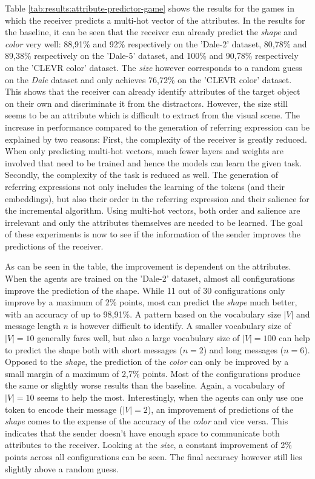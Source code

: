 Table \ref{tab:results:attribute-predictor-game} shows the results for the games in which the receiver predicts a multi-hot vector of the attributes.
In the results for the baseline, it can be seen that the receiver can already predict the \emph{shape} and \emph{color}  very well: 88,91\% and 92\% respectively on the 'Dale-2' dataset, 80,78\% and 89,38\% respectively on the 'Dale-5' dataset, and 100\% and 90,78\% respectively on the 'CLEVR color' dataset.
The \emph{size} however corresponds to a random guess on the \emph{Dale} dataset and only achieves 76,72\% on the 'CLEVR color' dataset.
This shows that the receiver can already identify attributes of the target object on their own and discriminate it from the distractors.
However, the size still seems to be an attribute which is difficult to extract from the visual scene.
The increase in performance compared to the generation of referring expression can be explained by two reasons:
First, the complexity of the receiver is greatly reduced.
When only predicting multi-hot vectors, much fewer layers and weights are involved that need to be trained and hence the models can learn the given task.
Secondly, the complexity of the task is reduced as well.
The generation of referring expressions not only includes the learning of the tokens (and their embeddings), but also their order in the referring expression and their salience for the incremental algorithm.
Using multi-hot vectors, both order and salience are irrelevant and only the attributes themselves are needed to be learned.
The goal of these experiments is now to see if the information of the sender improves the predictions of the receiver.

As can be seen in the table, the improvement is dependent on the attributes.
When the agents are trained on the 'Dale-2' dataset, almost all configurations improve the prediction of the shape.
While 11 out of 30 configurations only improve by a maximum of 2\% points, most can predict the \emph{shape} much better, with an accuracy of up to 98,91\%.
A pattern based on the vocabulary size $|V|$ and message length $n$ is however difficult to identify.
A smaller vocabulary size of $|V|=10$ generally fares well, but also a large vocabulary size of $|V|=100$ can help to predict the shape both with short messages ($n=2$) and long messages ($n=6$).
Opposed to the \emph{shape}, the prediction of the \emph{color} can only be improved by a small margin of a maximum of 2,7\% points.
Most of the configurations produce the same or slightly worse results than the baseline.
Again, a vocabulary of $|V|=10$ seems to help the most.
Interestingly, when the agents can only use one token to encode their message ($|V|=2$), an improvement of predictions of the \emph{shape} comes to the expense of the accuracy of the \emph{color} and vice versa.
This indicates that the sender doesn't have enough space to communicate both attributes to the receiver.
Looking at the \emph{size}, a constant improvement of 2\% points across all configurations can be seen.
The final accuracy however still lies slightly above a random guess.

